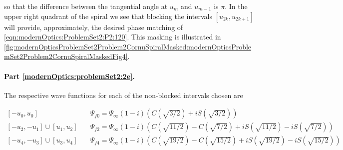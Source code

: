 {so that the difference between the tangential angle at $u_m$ and $u_{m-1}$ is $\pi$.  In the upper right quadrant of the spiral we see that blocking the intervals $[u_{2k}, u_{2k+1}]$ will provide, approximately, the desired phase matching of \ref{eqn:modernOptics:ProblemSet2:P2:120}.  This masking is illustrated in \cref{fig:modernOpticsProblemSet2Problem2CornuSpiralMasked:modernOpticsProblemSet2Problem2CornuSpiralMaskedFig4}.



\paragraph{Part \ref{modernOptics:problemSet2:2e}.  }

The respective wave functions for each of the non-blocked intervals chosen are

\begin{equation}\label{eqn:modernOptics:ProblemSet2:P2:180}
\begin{aligned}
[-u_0, u_0] &\quad \Psi_{f0} = \Psi_\infty (1 - i) \left( C\left(\sqrt{3/2}\right) + i S\left(\sqrt{3/2}\right) \right) \\
[-u_2, -u_1] \cup [u_1, u_2] &\quad \Psi_{f2} = \Psi_\infty (1 - i) \left( C\left(\sqrt{11/2}\right) - C\left(\sqrt{7/2}\right) + i S\left(\sqrt{11/2}\right) - iS\left(\sqrt{7/2}\right) \right) \\
[-u_4, -u_3] \cup [u_3, u_4] &\quad \Psi_{f4} = \Psi_\infty (1 - i) \left( C\left(\sqrt{19/2}\right) - C\left(\sqrt{15/2}\right) + i S\left(\sqrt{19/2}\right) - iS\left(\sqrt{15/2}\right) \right) \\
\end{aligned}
\end{equation}

}
